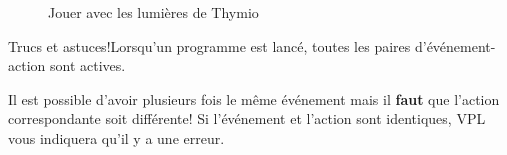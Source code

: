 \begin{figure}[h]
    \centering
    \hspace{1cm}
    \caption{Jouer avec les lumières de Thymio}
    \label{fig.colors}
\end{figure}

\begin{bclogo}[couleur = blue!30, arrondi = 0.1, logo = \bcinfo, ombre = true]{Trucs et astuces!}Lorsqu'un programme est lancé, toutes les paires d'événement-action sont actives.

Il est possible d'avoir plusieurs fois le même événement mais il \textbf{faut} que l'action correspondante soit différente! Si l'événement et l'action sont identiques, VPL vous indiquera qu'il y a une erreur.
\end{bclogo}




